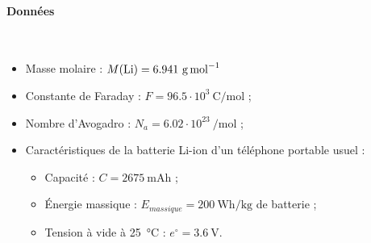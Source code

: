 \paragraph*{Données}

~

\begin{itemize}
	\item Masse molaire  : $M ( \ce{Li} ) = 6.941 ~ \si{\gram\per\mole}$
	\item Constante de Faraday : $F = 96.5 \cdot 10^3 ~ \si{\coulomb\per\mole}$ ;
	\item Nombre d'Avogadro : $N_a = 6.02 \cdot 10^{23} ~ \si{\per\mole}$ ;
	\item Caractéristiques de la batterie Li-ion d'un téléphone portable usuel :
\begin{itemize}
	\item Capacité : $C = 2 675 ~ \si{\milli\ampere\hour}$ ;
	\item Énergie massique : $E_{massique} = 200 ~ \si{\watt\hour\per\kilo\gram}$ de batterie ;
	\item Tension à vide à \SI{25}{\celsius} : $e^\circ = 3.6 ~ \si{\volt}$.
\end{itemize}
\end{itemize}
